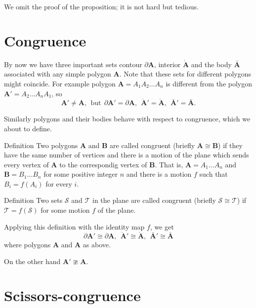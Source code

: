 We omit the proof of the proposition; it is not hard but tedious.

\section*{Congruence}

By now we have three important sets
contour $\partial\bm{A}$,
interior $\mathring{\bm{A}}$
and the body $\bar{\bm{A}}$
associated with any simple polygon $\bm{A}$.
Note that these sets for different polygons might coincide.
For example polygon $\bm{A}=A_1A_2\dots A_n$ is different from
the polygon $\bm{A}'=A_2\dots A_nA_1$, 
so 
\[\bm{A}'\ne \bm{A},
\ \ \text{but}\ \ 
\partial\bm{A}'=\partial\bm{A},\ \  
\mathring{\bm{A}}'=\mathring{\bm{A}},\ \ 
\bar{\bm{A}}'=\bar{\bm{A}}.\]

Similarly polygons and their bodies behave with respect to congruence,
which we about to define.

\begin{thm}{Definition}
Two polygons $\bm{A}$ and $\bm{B}$
are called congruent (briefly $\bm{A}\cong\bm{B}$)
if they have the same number of vertices 
and there is a motion of the plane 
which sends every vertex of $\bm{A}$ to the correspondig vertex of $\bm{B}$.
That is, $\bm{A}=A_1\dots A_n$ and $\bm{B}=B_1\dots B_n$
for some positive integer $n$ and there is a motion $f$
such that $B_i=f(A_i)$ for every $i$.
\end{thm}

\begin{thm}{Definition}\label{def:cong-sets}
Two sets $\mathcal{S}$ and $\mathcal{T}$ in the plane  
are called congruent 
(briefly $\mathcal{S}\cong \mathcal{T}$)
if 
$\mathcal{T}=f(\mathcal{S})$ for some motion $f$ of the plane.
\end{thm}

Applying this definition with the identity map $f$,
we get 
\[\partial\bm{A}'\cong\partial\bm{A},\ \  
\mathring{\bm{A}}'\cong\mathring{\bm{A}},\ \ 
\bar{\bm{A}}'\cong\bar{\bm{A}}\]
where polygons $\bm{A}$ and $\bm{A}$ as above.

On the other hand $\bm{A}'\ncong\bm{A}$.















\section*{Scissors-congruence}

